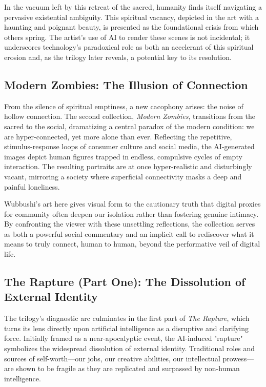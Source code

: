 \documentclass[12pt]{article}
\begin{document}
In the vacuum left by this retreat of the sacred, humanity finds itself navigating a pervasive existential ambiguity. This spiritual vacancy, depicted in the art with a haunting and poignant beauty, is presented as the foundational crisis from which others spring. The artist's use of AI to render these scenes is not incidental; it underscores technology's paradoxical role as both an accelerant of this spiritual erosion and, as the trilogy later reveals, a potential key to its resolution.

\subsection{Modern Zombies: The Illusion of Connection}

From the silence of spiritual emptiness, a new cacophony arises: the noise of hollow connection. The second collection, \textit{Modern Zombies}, transitions from the sacred to the social, dramatizing a central paradox of the modern condition: we are hyper-connected, yet more alone than ever. Reflecting the repetitive, stimulus-response loops of consumer culture and social media, the AI-generated images depict human figures trapped in endless, compulsive cycles of empty interaction. The resulting portraits are at once hyper-realistic and disturbingly vacant, mirroring a society where superficial connectivity masks a deep and painful loneliness.

Wubbushi’s art here gives visual form to the cautionary truth that digital proxies for community often deepen our isolation rather than fostering genuine intimacy. By confronting the viewer with these unsettling reflections, the collection serves as both a powerful social commentary and an implicit call to rediscover what it means to truly connect, human to human, beyond the performative veil of digital life.

\subsection{The Rapture (Part One): The Dissolution of External Identity}

The trilogy's diagnostic arc culminates in the first part of \textit{The Rapture}, which turns its lens directly upon artificial intelligence as a disruptive and clarifying force. Initially framed as a near-apocalyptic event, the AI-induced "rapture" symbolizes the widespread dissolution of external identity. Traditional roles and sources of self-worth—our jobs, our creative abilities, our intellectual prowess—are shown to be fragile as they are replicated and surpassed by non-human intelligence.
\end{document}

